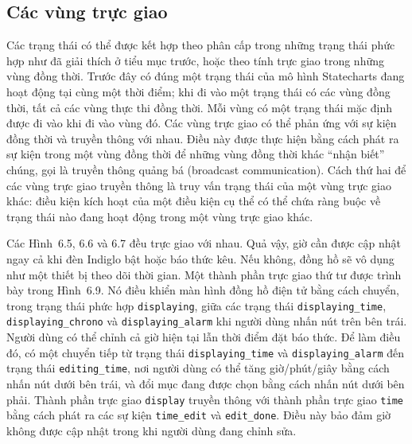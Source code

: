 \subsection{Các vùng trực giao}
Các trạng thái có thể được kết hợp theo phân cấp trong những trạng thái phức hợp như đã giải thích ở tiểu mục trước, hoặc theo tính trực giao trong những vùng đồng thời. Trước đây có đúng một trạng thái của mô hình Statecharts đang hoạt động tại cùng một thời điểm; khi đi vào một trạng thái có các vùng đồng thời, tất cả các vùng thực thi đồng thời. Mỗi vùng có một trạng thái mặc định được đi vào khi đi vào vùng đó. Các vùng trực giao có thể phản ứng với sự kiện đồng thời và truyền thông với nhau. Điều này được thực hiện bằng cách phát ra sự kiện trong một vùng đồng thời để những vùng đồng thời khác ``nhận biết'' chúng, gọi là truyền thông quảng bá (broadcast communication). Cách thứ hai để các vùng trực giao truyền thông là truy vấn trạng thái của một vùng trực giao khác: điều kiện kích hoạt của một điều kiện cụ thể có thể chứa ràng buộc về trạng thái nào đang hoạt động trong một vùng trực giao khác.

Các Hình~6.5, 6.6 và 6.7 đều trực giao với nhau. Quả vậy, giờ cần được cập nhật ngay cả khi đèn Indiglo bật hoặc báo thức kêu. Nếu không, đồng hồ sẽ vô dụng như một thiết bị theo dõi thời gian. Một thành phần trực giao thứ tư được trình bày trong Hình~6.9. Nó điều khiển màn hình đồng hồ điện tử bằng cách chuyển,
trong trạng thái phức hợp \texttt{displaying}, giữa các trạng thái \texttt{displaying\_time}, \texttt{displaying\_chrono} và \texttt{displaying\_alarm} khi người dùng nhấn nút trên bên trái. Người dùng có thể chỉnh cả giờ hiện tại lẫn thời điểm đặt báo thức. Để làm điều đó, có một chuyển tiếp từ trạng thái \texttt{displaying\_time} và \texttt{displaying\_alarm} đến trạng thái \texttt{editing\_time}, nơi người dùng có thể tăng giờ/phút/giây bằng cách nhấn nút dưới bên trái, và đổi mục đang được chọn bằng cách nhấn nút dưới bên phải. Thành phần trực giao \texttt{display} truyền thông với thành phần trực giao \texttt{time} bằng cách phát ra các sự kiện \texttt{time\_edit} và \texttt{edit\_done}. Điều này bảo đảm giờ không được cập nhật trong khi người dùng đang chỉnh sửa.


